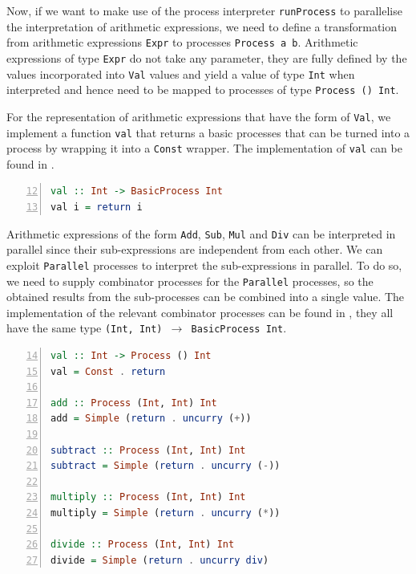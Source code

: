 Now, if we want to make use of the process interpreter \texttt{runProcess} to parallelise the interpretation of arithmetic expressions, we need to define a transformation from arithmetic expressions \texttt{Expr} to processes \texttt{Process a b}. Arithmetic expressions of type \texttt{Expr} do not take any parameter, they are fully defined by the values incorporated into \texttt{Val} values and yield a value of type \texttt{Int} when interpreted and hence need to be mapped to processes of type \texttt{Process () Int}.

For the representation of arithmetic expressions that have the form of \texttt{Val}, we implement a function \texttt{val} that returns a basic processes that can be turned into a process by wrapping it into a \texttt{Const} wrapper. The implementation of \texttt{val} can be found in .
\begin{lstlisting}[language=Haskell, caption=A function that generates basic processes for the representation of \texttt{Val} nodes., label=lst:arith_val, numbers=left, frame=bt, firstnumber=12]
val :: Int -> BasicProcess Int
val i = return i
\end{lstlisting}

Arithmetic expressions of the form \texttt{Add}, \texttt{Sub}, \texttt{Mul} and \texttt{Div} can be interpreted in parallel since their sub-expressions are independent from each other. We can exploit \texttt{Parallel} processes to interpret the sub-expressions in parallel. To do so, we need to supply combinator processes for the \texttt{Parallel} processes, so the obtained results from the sub-processes can be combined into a single value. The implementation of the relevant combinator processes can be found in , they all have the same type \texttt{(Int, Int) $\to$ BasicProcess Int}.
\begin{lstlisting}[language=Haskell, caption=Basic processes for the combination of results from processes that have been executed in parallel., label=lst:arith_combinators,numbers=left, frame=bt, firstnumber=14]
val :: Int -> Process () Int
val = Const . return 

add :: Process (Int, Int) Int
add = Simple (return . uncurry (+))

subtract :: Process (Int, Int) Int
subtract = Simple (return . uncurry (-))

multiply :: Process (Int, Int) Int
multiply = Simple (return . uncurry (*))

divide :: Process (Int, Int) Int
divide = Simple (return . uncurry div)
\end{lstlisting}

